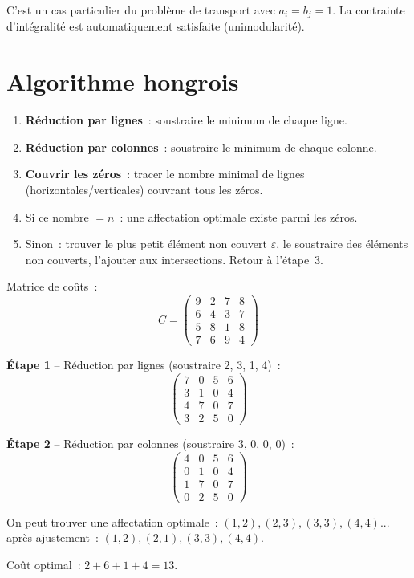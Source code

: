 \begin{remarque}
C'est un cas particulier du probl\`eme de transport avec $a_i = b_j = 1$.
La contrainte d'int\'egralit\'e est automatiquement satisfaite (unimodularit\'e).
\end{remarque}

\section{Algorithme hongrois}

\begin{algorithme}[title=\textbf{Algorithme hongrois (m\'ethode de Kuhn-Munkres)}]
\begin{enumerate}
  \item \textbf{R\'eduction par lignes}~: soustraire le minimum de chaque ligne.
  \item \textbf{R\'eduction par colonnes}~: soustraire le minimum de chaque
        colonne.
  \item \textbf{Couvrir les z\'eros}~: tracer le nombre minimal de lignes
        (horizontales/verticales) couvrant tous les z\'eros.
  \item Si ce nombre $= n$~: une affectation optimale existe parmi les z\'eros.
  \item Sinon~: trouver le plus petit \'el\'ement non couvert $\varepsilon$,
        le soustraire des \'el\'ements non couverts, l'ajouter aux
        intersections.  Retour \`a l'\'etape~3.
\end{enumerate}
\end{algorithme}

\begin{exemple}
Matrice de co\^uts~:
\[
C = \begin{pmatrix}
  9 & 2 & 7 & 8 \\
  6 & 4 & 3 & 7 \\
  5 & 8 & 1 & 8 \\
  7 & 6 & 9 & 4
\end{pmatrix}
\]

\textbf{\'Etape 1} -- R\'eduction par lignes (soustraire 2, 3, 1, 4)~:
\[
\begin{pmatrix}
  7 & 0 & 5 & 6 \\
  3 & 1 & 0 & 4 \\
  4 & 7 & 0 & 7 \\
  3 & 2 & 5 & 0
\end{pmatrix}
\]

\textbf{\'Etape 2} -- R\'eduction par colonnes (soustraire 3, 0, 0, 0)~:
\[
\begin{pmatrix}
  4 & 0 & 5 & 6 \\
  0 & 1 & 0 & 4 \\
  1 & 7 & 0 & 7 \\
  0 & 2 & 5 & 0
\end{pmatrix}
\]

On peut trouver une affectation optimale~:
$(1,2), (2,3), (3,3), (4,4)$... apr\`es ajustement~:
$(1,2), (2,1), (3,3), (4,4)$.

Co\^ut optimal~: $2 + 6 + 1 + 4 = 13$.
\end{exemple}

